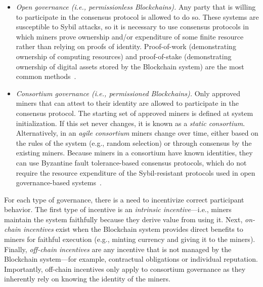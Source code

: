\begin{itemize}
	\item \emph{Open governance (i.e., permissionless Blockchains).}
	Any party that is willing to participate in the consensus protocol is allowed to do so.
	These systems are susceptible to Sybil attacks, so it is necessary to use 
	consensus protocols in which miners prove ownership and/or expenditure of 
	some finite resource rather than relying on proofs of identity.
	Proof-of-work (demonstrating ownership of computing resources) and proof-of-stake (demonstrating ownership of digital assets stored by the Blockchain system) are the most common methods~\cite{Bano17,garay2018consensus}.
	
	\item \emph{Consortium governance (i.e., permissioned Blockchains).}
	Only approved miners that can attest to their identity are allowed to participate in the consensus protocol.
	The starting set of approved miners is defined at system initialization.
	If this set never changes, it is known as a \emph{static consortium}.
	Alternatively, in an \emph{agile consortium} miners change over time, either based on the rules of the system (e.g., random selection) or through consensus by the existing miners.
	Because miners in a consortium have known identities, they can use Byzantine fault tolerance-based consensus protocols, which do not require the resource expenditure of the Sybil-resistant protocols used in open governance-based systems~\cite{Bano17,garay2018consensus}.		
\end{itemize}

For each type of governance, there is a need to incentivize correct participant behavior.
The first type of incentive is an \emph{intrinsic incentive}---i.e., miners maintain the system faithfully because they derive value from using it.
Next, \emph{on-chain incentives} exist when the Blockchain system provides direct benefits to miners for faithful execution (e.g., minting currency and giving it to the miners).
Finally, \emph{off-chain incentives} are any incentive that is not managed by the Blockchain system---for example, contractual obligations or individual reputation.
Importantly, off-chain incentives only apply to consortium governance as they inherently rely on knowing the identity of the miners.


